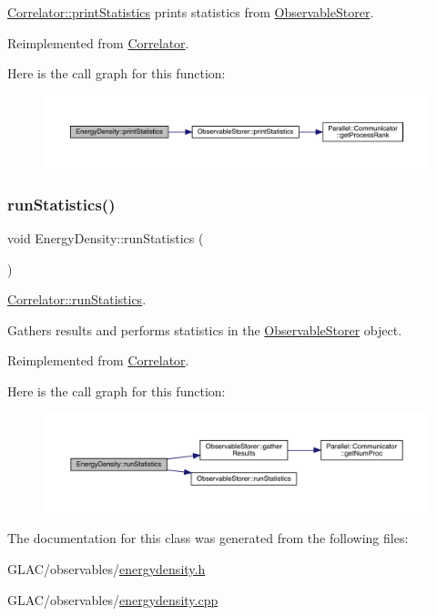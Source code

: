 \mbox{\hyperlink{class_correlator_a2168d677f547769784781d2e2aaa53cf}{Correlator\+::print\+Statistics}} prints statistics from \mbox{\hyperlink{class_observable_storer}{Observable\+Storer}}. 



Reimplemented from \mbox{\hyperlink{class_correlator_a2168d677f547769784781d2e2aaa53cf}{Correlator}}.

Here is the call graph for this function\+:\nopagebreak
\begin{figure}[H]
\begin{center}
\leavevmode
\includegraphics[width=350pt]{class_energy_density_ad108e32bc670f17f15b4ed433d8bbec7_cgraph}
\end{center}
\end{figure}
\mbox{\label{class_energy_density_a584e164453ce880a45478c9b48ce2c4b}} 
\subsubsection{\texorpdfstring{runStatistics()}{runStatistics()}}
{\footnotesize\ttfamily void Energy\+Density\+::run\+Statistics (\begin{DoxyParamCaption}{ }\end{DoxyParamCaption})\hspace{0.3cm}{\ttfamily [virtual]}}



\mbox{\hyperlink{class_correlator_a35197b1d12b62ef30b79c0138a26456e}{Correlator\+::run\+Statistics}}. 

Gathers results and performs statistics in the \mbox{\hyperlink{class_observable_storer}{Observable\+Storer}} object. 

Reimplemented from \mbox{\hyperlink{class_correlator_a35197b1d12b62ef30b79c0138a26456e}{Correlator}}.

Here is the call graph for this function\+:\nopagebreak
\begin{figure}[H]
\begin{center}
\leavevmode
\includegraphics[width=350pt]{class_energy_density_a584e164453ce880a45478c9b48ce2c4b_cgraph}
\end{center}
\end{figure}


The documentation for this class was generated from the following files\+:\begin{DoxyCompactItemize}
\item 
G\+L\+A\+C/observables/\mbox{\hyperlink{energydensity_8h}{energydensity.\+h}}\item 
G\+L\+A\+C/observables/\mbox{\hyperlink{energydensity_8cpp}{energydensity.\+cpp}}\end{DoxyCompactItemize}
